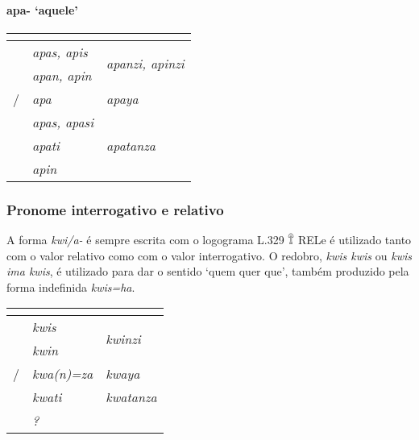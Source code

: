 \paragraph{apa- `aquele'}

\begin{center}
	\begin{tabular}[c]{lll}
		\toprule
		                 & \Sg{}\emph{}       & \Pl{}\emph{}                             \\
		\midrule
		\Nom{} \Com{}    & \emph{apas, apis}  & \multirow{2}{4em}{\emph{apanzi, apinzi}} \\
		\Acu{} \Com{}    & \emph{apan, apin}  &                                          \\
		\Nom/\Acu\Neut{} & \emph{apa}         & \emph{apaya}                             \\
		\Gen{}           & \emph{apas, apasi} &                                          \\
		\Dat{}           & \emph{apati}       & \emph{apatanza}                          \\
		\Abl{}           & \emph{apin}        & \emph{}                                  \\
		\bottomrule
	\end{tabular}
\end{center}

\subsubsection{Pronome interrogativo e relativo}

A forma \emph{kwi\slash{}a-} é sempre escrita com o logograma L.329 𔕰 REL\@ e
é utilizado tanto com o valor relativo como com o valor interrogativo.
O redobro, \emph{kwis kwis} ou \emph{kwis ima kwis}, é utilizado para dar o
sentido `quem quer que', também produzido pela forma indefinida \emph{kwis=ha}.

\begin{center}
	\begin{tabular}[c]{lll}
		\toprule
		                 & \Sg{}\emph{}       & \Pl{}\emph{}                     \\
		\midrule
		\Nom{} \Com{}    & \emph{kwis}        & \multirow{2}{4em}{\emph{kwinzi}} \\
		\Acu{} \Com{}    & \emph{kwin}        &                                  \\
		\Nom/\Acu\Neut{} & \emph{kwa{(n)}=za} & \emph{kwaya}                     \\
		\Dat{}           & \emph{kwati}       & \emph{kwatanza}                  \\
		\Abl{}           & \emph{?}           & \emph{}                          \\
		\bottomrule
	\end{tabular}
\end{center}

